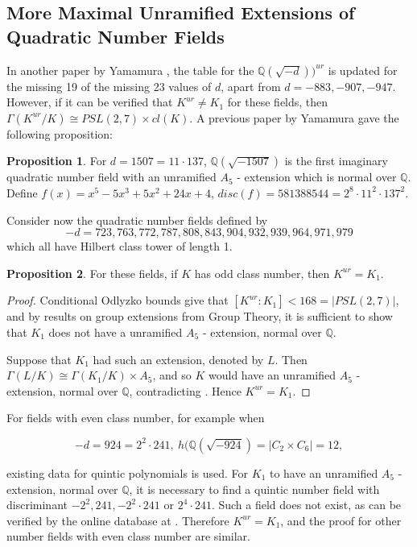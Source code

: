 \documentclass[12pt]{extarticle}
\newcommand{\Q}{\mathbb{Q}}
\newcommand{\<}{\langle}
\renewcommand{\>}{\rangle}
\theoremstyle{definition}
\newtheorem{proposition}{Proposition}
\begin{document}
\subsection{More Maximal Unramified Extensions of Quadratic Number Fields}
In another paper by Yamamura \cite{YAMA2001}, the table for the $\Q(\sqrt{-d}))^{ur}$ is updated for the missing 19 of the missing 23 values of $d$, apart from $d= -883,-907,-947$. However, if it can be verified that $K^{ur} \neq K_1$ for these fields, then $\Gamma(K^{ur}/K) \cong PSL(2,7) \times cl(K)$. 
A previous paper by Yamamura \cite{YAMA1997} gave the following proposition: 
\begin{proposition}
\label{prop:1507}
For $d=1507 = 11 \cdot 137$, $\Q(\sqrt{-1507})$ is the first imaginary quadratic number field with an unramified $A_5$ - extension which is normal over $\Q$.
Define $f(x) = x^5 -5x^3 + 5x^2 + 24x + 4$, $disc(f) = 581388544 = 2^8 \cdot 11^2 \cdot 137^2$. 
\end{proposition}
Consider now the quadratic number fields defined by 
\begin{equation}
-d = 723, 763, 772, 787, 808, 843, 904, 932, 939, 964, 971, 979
\end{equation}
 which all have Hilbert class tower of length 1. 
\begin{proposition}
For these fields, if $K$ has odd class number, then $K^{ur} = K_1$. 
\end{proposition}
\begin{proof}
 Conditional Odlyzko bounds give that $[K^{ur}:K_1]<168 = |PSL(2,7)|$, and by results on group extensions from Group Theory, it is sufficient to show that $K_1$ does not have a unramified $A_5$ - extension, normal over $\Q$. \par 

 Suppose that $K_1$ had such an extension, denoted by $L$. Then $\Gamma(L/K) \cong \Gamma(K_1/K) \times A_5$, and so $K$ would have an unramified $A_5$ - extension, normal over $\Q$, contradicting . Hence $K^{ur} = K_1$. 

\end{proof}
For fields with even class number, for example when

\begin{equation}
-d = 924 = 2^2 \cdot 241, \: h(\Q \left(\sqrt{-924}\right) = |C_2 \times C_6| = 12,
\end{equation}

existing data for quintic polynomials is used. For $K_1$ to have an unramified $A_5$ - extension, normal over $\Q$, it is necessary to find a quintic number field with discriminant $-2^2,241,-2^2 \cdot 241$ or $2^4 \cdot 241$. Such a field does not exist, as can be verified by the online database at \cite{JONE2}. Therefore $K^{ur} = K_1$, and the proof for other number fields with even class number are similar. \par
\end{document}
